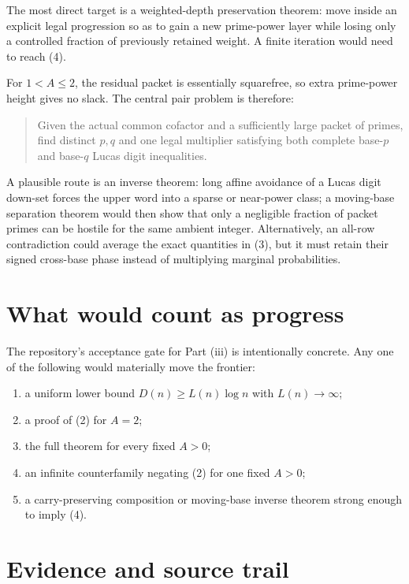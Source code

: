 \documentclass[11pt]{article}
\begin{document}
The most direct target is a weighted-depth preservation theorem: move inside
an explicit legal progression so as to gain a new prime-power layer while
losing only a controlled fraction of previously retained weight.  A finite
iteration would need to reach (4).

For $1<A\leq2$, the residual packet is essentially squarefree, so extra
prime-power height gives no slack.  The central pair problem is therefore:

\begin{quote}
Given the actual common cofactor and a sufficiently large packet of primes,
find distinct $p,q$ and one legal multiplier satisfying both complete
base-$p$ and base-$q$ Lucas digit inequalities.
\end{quote}

A plausible route is an inverse theorem: long affine avoidance of a Lucas
digit down-set forces the upper word into a sparse or near-power class; a
moving-base separation theorem would then show that only a negligible
fraction of packet primes can be hostile for the same ambient integer.
Alternatively, an all-row contradiction could average the exact quantities
in (3), but it must retain their signed cross-base phase instead of multiplying
marginal probabilities.

\section{What would count as progress}

The repository's acceptance gate for Part (iii) is intentionally concrete.
Any one of the following would materially move the frontier:
\begin{enumerate}
\item a uniform lower bound $D(n)\geq L(n)\log n$ with $L(n)\to\infty$;
\item a proof of (2) for $A=2$;
\item the full theorem for every fixed $A>0$;
\item an infinite counterfamily negating (2) for one fixed $A>0$;
\item a carry-preserving composition or moving-base inverse theorem strong
enough to imply (4).
\end{enumerate}

\section{Evidence and source trail}
\end{document}
